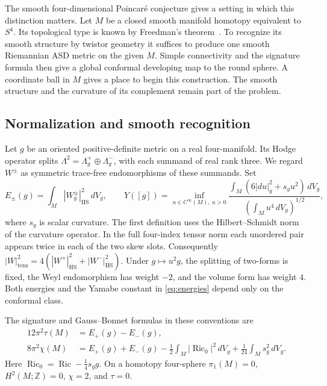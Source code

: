 \documentclass[11pt]{article}
\numberwithin{equation}{section}
\theoremstyle{definition}
\theoremstyle{remark}
\DeclareMathOperator{\Ric}{Ric}
\begin{document}
The smooth four-dimensional Poincar\'e conjecture gives a setting in
which this distinction matters. Let \(M\) be a closed smooth manifold
homotopy equivalent to \(S^4\). Its topological type is known by
Freedman's theorem~\cite{Freedman1982}. To recognize its smooth
structure by twistor geometry it suffices to produce one smooth
Riemannian ASD metric on the given \(M\). Simple connectivity and
the signature formula then give a global conformal developing map to
the round sphere. A coordinate ball in \(M\) gives a place to begin
this construction. The smooth structure and the curvature of its
complement remain part of the problem.

\subsection{Normalization and smooth recognition}

Let \(g\) be an oriented positive-definite metric on a real
four-manifold. Its Hodge operator splits
\(\Lambda^2=\Lambda_g^+\oplus\Lambda_g^-\), with each summand of real
rank three. We regard \(W^\pm\) as symmetric trace-free endomorphisms
of these summands. Set
\begin{equation}\label{eq:energies}
 E_\pm(g)=\int_M |W^\pm_g|_{\mathrm{HS}}^2\,dV_g,\qquad
 Y([g])=\inf_{u\in C^\infty(M),\ u>0}
 \frac{\int_M(6|du|_g^2+s_g u^2)\,dV_g}
      {(\int_M u^4\,dV_g)^{1/2}},
\end{equation}
where \(s_g\) is scalar curvature. The first definition uses the
Hilbert--Schmidt norm of the curvature operator. In the full
four-index tensor norm each unordered pair appears twice in each
of the two skew slots. Consequently
\(|W|_{\mathrm{tens}}^2=4(|W^+|_{\mathrm{HS}}^2+
|W^-|_{\mathrm{HS}}^2)\). Under \(g\mapsto u^2g\), the splitting
of two-forms is fixed, the Weyl endomorphism has weight \(-2\), and
the volume form has weight \(4\). Both energies and the Yamabe
constant in \eqref{eq:energies} depend only on the conformal class.

The signature and Gauss--Bonnet formulas in these conventions
are~\cite{Hirzebruch1971Signature,ChangGurskyYang2003}
\begin{align}
12\pi^2\tau(M)&=E_+(g)-E_-(g),\label{eq:sign}\\
8\pi^2\chi(M)&=E_+(g)+E_-(g)
 -\tfrac12\int_M|\Ric_0|^2\,dV_g
 +\tfrac1{24}\int_M s_g^2\,dV_g .\label{eq:GB}
\end{align}
Here \(\Ric_0=\Ric-\tfrac14 s_g g\). On a homotopy four-sphere
\(\pi_1(M)=0\), \(H^2(M;\mathbb Z)=0\), \(\chi=2\), and \(\tau=0\).
\end{document}
